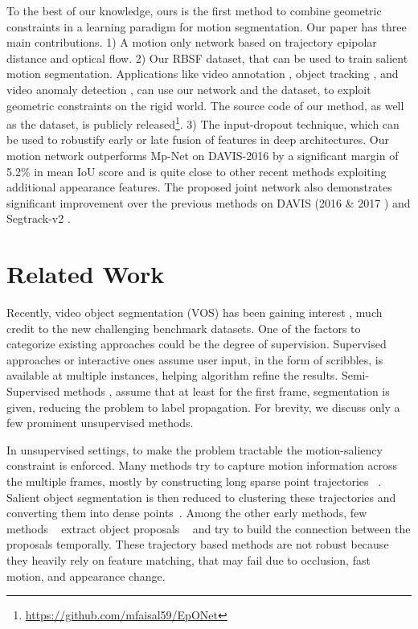 \documentclass[10pt,twocolumn,letterpaper]{article}
\begin{document}
To the best of our knowledge, ours is the first method to combine geometric constraints in a learning paradigm for motion segmentation. Our paper has three main contributions. 1) A motion only network based on trajectory epipolar distance and optical flow. 2) Our RBSF dataset, that can be used to train salient motion segmentation. Applications like video annotation \cite{feng2004multiple}, object tracking \cite{yilmaz2006object}, and video anomaly detection \cite{xiang2008video}, can use our network and the dataset, to exploit geometric constraints on the rigid world. The source code of our method, as well as the dataset, is publicly released\footnote{\url{https://github.com/mfaisal59/EpONet}}.
3) The input-dropout technique, which can be used to robustify early or late fusion of features in deep architectures. Our motion network outperforms Mp-Net on DAVIS-2016 \cite{DAVIS2016} by a significant margin of 5.2\% in mean IoU score and is quite close to other recent methods exploiting additional appearance features. The proposed joint network also demonstrates significant improvement over the previous methods on DAVIS (2016 \cite{DAVIS2016} \& 2017 \cite{DAVIS2017}) and Segtrack-v2 \cite{segtrackv2}.
 
\section{Related Work}
Recently, video object segmentation (VOS) has been gaining interest \cite{fusionseg,MpNet, visMem,PDB,STP,SegFlow,ARP}, much credit to the new challenging benchmark datasets. 
One of the factors to categorize existing approaches could be the degree of supervision.
Supervised approaches \cite{NagarajaSB15, ChenPMG18} or interactive ones assume user input, in the form of scribbles, is available at multiple instances, helping algorithm refine the results. 
Semi-Supervised methods \cite{STP,MoNetECCV2018, videoMatchECCV2018, instanceEmbTrans2018, CNN_MRF, osvosJournal, PReMVOS}, assume that at least for the first frame, segmentation is given, reducing the problem to label propagation. 
For brevity, we discuss only a few prominent unsupervised methods.

In unsupervised settings, to make the problem tractable the motion-saliency constraint is enforced. 
Many methods try to capture motion information across the multiple frames, mostly by constructing long sparse point trajectories  ~\cite{brox2010object, fragkiadaki2012video, ochs2012higher, shi1998motion}. Salient object segmentation is then reduced to clustering these trajectories \cite{CUT} and converting them into dense points~\cite{MSG}.
Among the other early methods, few methods ~\cite{KEY, segtrackv2, ma2012maximum, zhang2013video, perazzi2015fully} extract object proposals ~\cite{endres2010category} and try to build the connection between the proposals temporally. 
These trajectory based methods are not robust because they heavily rely on feature matching, that may fail due to occlusion, fast motion, and appearance change.
\end{document}
